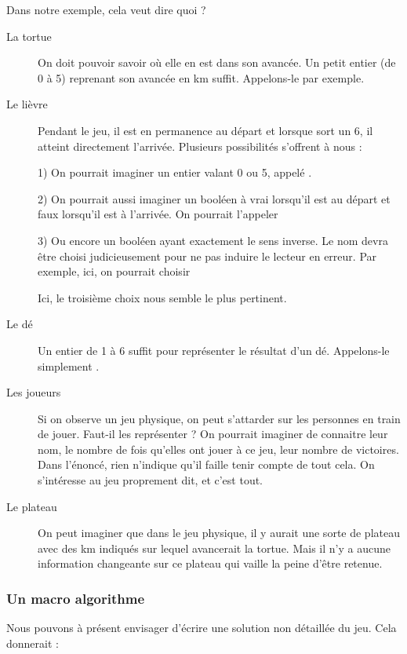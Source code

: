 			Dans notre exemple, cela veut dire quoi ?
			\begin{description}
			\item[La tortue]
				On doit pouvoir savoir où elle en est dans son avancée.
				Un petit entier (de 0 à 5) reprenant son avancée en km suffit.
				Appelons-le  par exemple.
			\item[Le lièvre]
				Pendant le jeu, il est en permanence au départ
				et lorsque sort un 6, il atteint directement l'arrivée.
				Plusieurs possibilités s'offrent à nous :
			
				1) On pourrait imaginer un entier valant 0 ou 5,
				appelé .

				2) On pourrait aussi imaginer un booléen à vrai 
				lorsqu'il est au départ et faux lorsqu'il est à l'arrivée.
				On pourrait l'appeler 

				3) Ou encore un booléen ayant exactement le sens inverse.
				Le nom devra être choisi judicieusement pour ne pas induire
				le lecteur en erreur.
				Par exemple, ici, on pourrait choisir 

				Ici, le troisième choix nous semble le plus pertinent.
			\item[Le dé]
				Un entier de 1 à 6 suffit pour représenter le résultat d'un dé.
				Appelons-le simplement .
			\item[Les joueurs]
				Si on observe un jeu physique,
				on peut s'attarder sur les personnes en train de jouer.
				Faut-il les représenter ?
				On pourrait imaginer de connaitre leur nom,
				le nombre de fois qu'elles ont jouer à ce jeu,
				leur nombre de victoires.
				Dans l'énoncé, 
				rien n'indique qu'il faille tenir compte de tout cela. 
				On s'intéresse au jeu proprement dit, et c'est tout.
			\item[Le plateau]
				On peut imaginer que dans le jeu physique,
				il y aurait une sorte de plateau 
				avec des km indiqués
				sur lequel avancerait la tortue.
				Mais il n'y a aucune information changeante
				sur ce plateau qui vaille la peine d'être retenue.
			\end{description}

		\subsubsection*{Un macro algorithme}
				
			Nous pouvons à présent envisager d'écrire une solution
			non détaillée du jeu.
			Cela donnerait :
			

